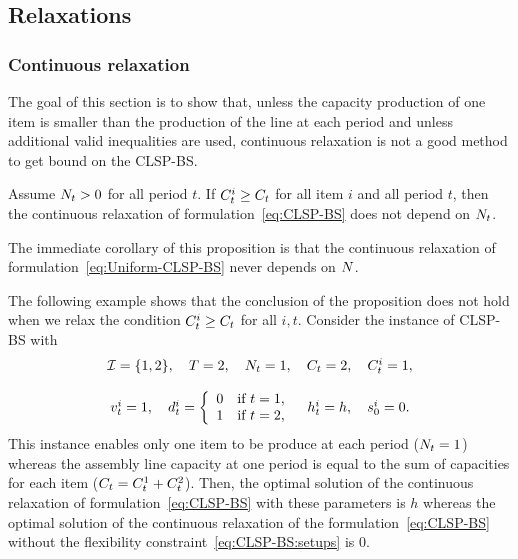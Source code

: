 \subsection{Relaxations}
\label{sec:PDP:deterministic:theoretical-results:continuous-relaxation}

\subsubsection{Continuous relaxation}

The goal of this section is to show that, unless the capacity production of one item is smaller than the production of the line at each period and unless additional valid inequalities are used, continuous relaxation is not a good method to get bound on the CLSP-BS.



\begin{prop}\label{prop:relaxation-independant-N}
Assume $N_t>0$ for all period $t$.
If $C_t^i\ge C_t$ for all item $i$ and all period $t$, then the continuous relaxation of formulation~\eqref{eq:CLSP-BS} does not depend on $N_t$.
\end{prop}

The immediate corollary of this proposition is that the continuous relaxation of formulation~\eqref{eq:Uniform-CLSP-BS} never depends on $N$.


The following example shows that the conclusion of the proposition does not hold when we relax the condition $C_t^i\ge C_t$ for all $i,t$.
Consider the instance of CLSP-BS with
\begin{equation}
\begin{array}{c}
  \REF=\crbracket{1,2}
  ,\quad
  \horizon=2
  ,\quad
  \nbsetups_t=1
  ,\quad
  \capacity_t=2
  ,\quad
  \capacity_t^i=1
  ,
\\ \\
  \rate_t^i=1
  ,\quad
  \demand_t^i
  =\left\{
  \begin{array}{ll}
  0 & \mbox{if}\ t=1,
  \\
  1 & \mbox{if}\ t=2,
  \end{array}
  \right.
  \quad
  \holding_t^i=\holding
  ,\quad
  \inventory_0^i=0.
\end{array}
\end{equation}
This instance enables only one item to be produce at each period ($N_t=1$) whereas the assembly line capacity at one period is equal to the sum of capacities for each item ($C_t=C_t^1+C_t^2$).
Then, the optimal solution of the continuous relaxation of formulation~\eqref{eq:CLSP-BS} with these parameters is $h$ whereas the optimal solution of the continuous relaxation of the formulation~\eqref{eq:CLSP-BS} without the flexibility constraint~\eqref{eq:CLSP-BS:setups} is 0.


